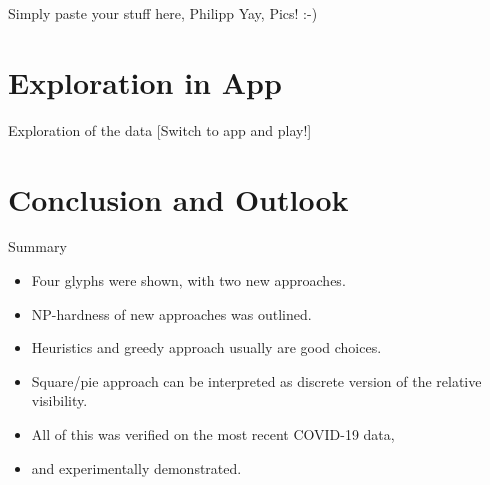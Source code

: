\documentclass{beamer}
\begin{document}
  \begin{frame}{Simply paste your stuff here, Philipp}
    Yay, Pics! :-)
  \end{frame}

  \section{Exploration in App}

  \begin{frame}{Exploration of the data}
    [Switch to app and play!]
  \end{frame}

  \section{Conclusion and Outlook}

  \begin{frame}{Summary}

    \begin{itemize}
      \item Four glyphs were shown, with two new approaches.
      \item NP-hardness of new approaches was outlined.
      \item Heuristics and greedy approach usually are good choices.
      \item Square/pie approach can be interpreted as discrete version of the relative visibility.
      \item All of this was verified on the most recent COVID-19 data,
      \item and experimentally demonstrated.
    \end{itemize}
  \end{frame}
\end{document}
